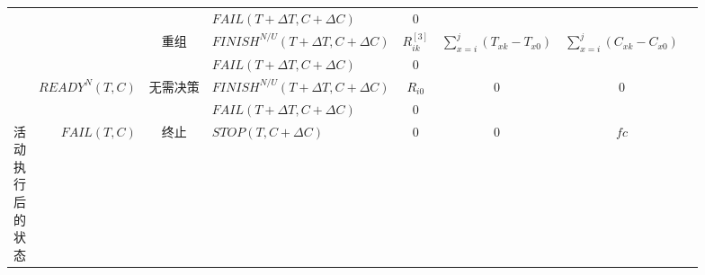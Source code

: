 \begin{table}[htbp]
\begin{tabular}{rrrrrrrr}
        \multicolumn{1}{c|}{} 
        &       
        & \multicolumn{1}{|c}{} 
        & \multicolumn{1}{|l}{$FAIL(T+\Delta T,C+\Delta C)$} 
        & \multicolumn{1}{|c}{0} 
        & \multicolumn{1}{|c}{} 
        & \multicolumn{1}{|c}{} \\
        \cline{3-7}

        \multicolumn{1}{c|}{} 
        &       
        & \multicolumn{1}{|c}{\multirow{2}{*}{重组}} 
        & \multicolumn{1}{|l}{$FINISH^{N/U}(T+\Delta T,C+\Delta C)$} 
        & \multicolumn{1}{|c}{$R_{ik}^{[3]}$} 
        & \multicolumn{1}{|c}{\multirow{2}{*}{$\sum\limits_{x = i}^j {({T_{xk}} - {T_{x0}})} $}}
        & \multicolumn{1}{|c}{\multirow{2}{*}{$\sum\limits_{x = i}^j {({C_{xk}} - {C_{x0}})} $}} \\

        \multicolumn{1}{c|}{} 
        &       
        & \multicolumn{1}{|c}{} 
        & \multicolumn{1}{|l}{$FAIL(T+\Delta T,C+\Delta C)$} 
        & \multicolumn{1}{|c}{0} 
        & \multicolumn{1}{|c}{}
        & \multicolumn{1}{|c}{} \\
        \cline{2-7}

        \multicolumn{1}{c|}{} 
        & \multirow{2}{*}{$READY^N(T,C)$} 
        & \multicolumn{1}{|c}{\multirow{2}{*}{无需决策}} 
        & \multicolumn{1}{|l}{$FINISH^{N/U}(T+\Delta T,C+\Delta C)$} 
        & \multicolumn{1}{|c}{$R_{i0}$} 
        & \multicolumn{1}{|c}{\multirow{2}{*}{0}} 
        & \multicolumn{1}{|c}{\multirow{2}{*}{0}} \\

        \multicolumn{1}{c|}{} 
        &       
        & \multicolumn{1}{|c}{} 
        & \multicolumn{1}{|l}{$FAIL(T+\Delta T,C+\Delta C)$} 
        & \multicolumn{1}{|c}{0} 
        & \multicolumn{1}{|c}{} 
        & \multicolumn{1}{|c}{} \\
        \cline{1-7}

        \multicolumn{1}{c|}{\multirow{11}{*}{\parbox{1em}{活\\动\\执\\行\\后\\的\\状\\态}}} 
        & \multirow{7}{*}{$FAIL(T,C)$} 
        & \multicolumn{1}{|c}{终止} 
        & \multicolumn{1}{|l}{$STOP(T,C+\Delta C)$} 
        & \multicolumn{1}{|c}{0} 
        & \multicolumn{1}{|c}{0} 
        & \multicolumn{1}{|c}{$fc$} \\
        \cline{3-7}
        

\end{tabular}
\end{table}
